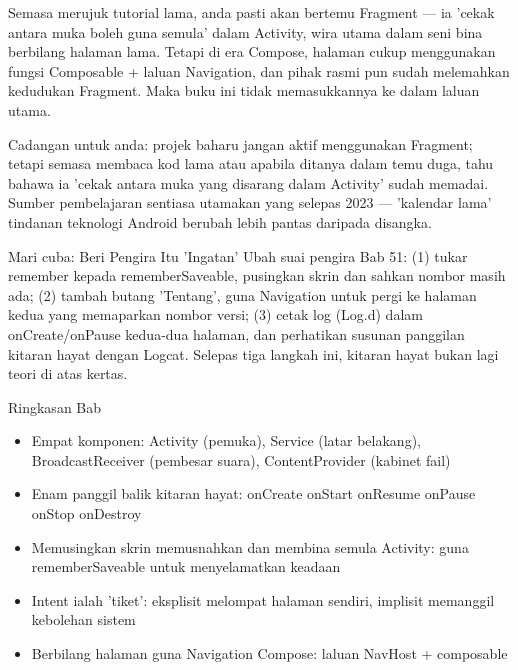 
Semasa merujuk tutorial lama, anda pasti akan bertemu Fragment — ia 'cekak antara muka boleh guna semula' dalam Activity, wira utama dalam seni bina berbilang halaman lama. Tetapi di era Compose, halaman cukup menggunakan fungsi Composable + laluan Navigation, dan pihak rasmi pun sudah melemahkan kedudukan Fragment. Maka buku ini tidak memasukkannya ke dalam laluan utama.

Cadangan untuk anda: projek baharu jangan aktif menggunakan Fragment; tetapi semasa membaca kod lama atau apabila ditanya dalam temu duga, tahu bahawa ia 'cekak antara muka yang disarang dalam Activity' sudah memadai. Sumber pembelajaran sentiasa utamakan yang selepas 2023 — 'kalendar lama' tindanan teknologi Android berubah lebih pantas daripada disangka.

\begin{tcbpractice}{Mari cuba: Beri Pengira Itu 'Ingatan'}
Ubah suai pengira Bab 51: (1) tukar remember kepada rememberSaveable, pusingkan skrin dan sahkan nombor masih ada; (2) tambah butang 'Tentang', guna Navigation untuk pergi ke halaman kedua yang memaparkan nombor versi; (3) cetak log (Log.d) dalam onCreate/onPause kedua-dua halaman, dan perhatikan susunan panggilan kitaran hayat dengan Logcat. Selepas tiga langkah ini, kitaran hayat bukan lagi teori di atas kertas.

\end{tcbpractice}

\begin{tcbsummary}{Ringkasan Bab}
\begin{itemize}
  \item Empat komponen: Activity (pemuka), Service (latar belakang), BroadcastReceiver (pembesar suara), ContentProvider (kabinet fail)
  \item Enam panggil balik kitaran hayat: onCreate onStart onResume onPause onStop onDestroy
  \item Memusingkan skrin memusnahkan dan membina semula Activity: guna rememberSaveable untuk menyelamatkan keadaan
  \item Intent ialah 'tiket': eksplisit melompat halaman sendiri, implisit memanggil kebolehan sistem
  \item Berbilang halaman guna Navigation Compose: laluan NavHost + composable
\end{itemize}

\end{tcbsummary}
